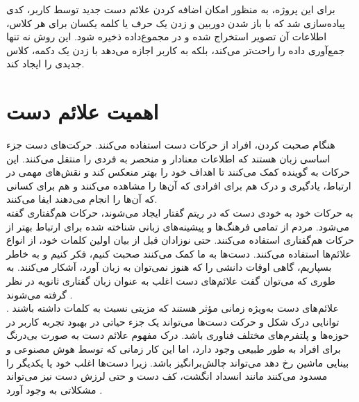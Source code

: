 برای این پروژه، به منظور امکان اضافه کردن علائم دست جدید توسط کاربر، کدی پیاده‌سازی شد که با باز شدن دوربین و زدن یک حرف 
یا کلمه یکسان برای هر کلاس، اطلاعات آن تصویر استخراج شده و در مجموع‌داده ذخیره شود. این روش نه تنها جمع‌آوری داده را راحت‌تر می‌کند، بلکه به کاربر اجازه می‌دهد با زدن یک دکمه، کلاس جدیدی را ایجاد کند.


\section{اهمیت علائم دست}
هنگام صحبت کردن، افراد از حرکات دست استفاده می‌کنند. حرکت‌های دست جزء اساسی زبان هستند که اطلاعات معنادار و منحصر به فردی را منتقل می‌کنند. این حرکات به گوینده کمک می‌کنند تا اهداف خود
 را بهتر منعکس کند و نقش‌های مهمی در ارتباط، یادگیری و درک هم برای افرادی که آن‌ها را مشاهده می‌کنند و هم برای کسانی که آن‌ها را انجام می‌دهند ایفا می‌کنند.
\\
به حرکات خود به خودی دست که در ریتم گفتار ایجاد می‌شوند، حرکات هم‌گفتاری  گفته می‌شود. مردم از تمامی فرهنگ‌ها و پیشینه‌های زبانی شناخته شده برای ارتباط بهتر از حرکات هم‌گفتاری استفاده می‌کنند. حتی نوزادان قبل از بیان اولین کلمات خود، از انواع علائم‌ها استفاده می‌کنند. دست‌ها به ما کمک می‌کنند صحبت کنیم، فکر کنیم و به خاطر بسپاریم، گاهی اوقات دانشی را که هنوز
 نمی‌توان به زبان آورد، آشکار می‌کنند. به طوری که می‌توان گفت علائم‌های دست اغلب به عنوان زبان گفتاری ثانویه در نظر گرفته می‌شوند \cite{clough2020role}.
\\
علائم‌های دست به‌ویژه زمانی مؤثر هستند که مزیتی نسبت به کلمات داشته باشند \cite{kang2016hands}. توانایی درک شکل و حرکت دست‌ها می‌تواند یک
 جزء حیاتی در بهبود تجربه کاربر  در حوزه‌ها و پلتفرم‌های مختلف فناوری باشد. درک مفهوم علائم دست به صورت بی‌درنگ برای افراد به طور طبیعی وجود دارد، اما این کار زمانی که توسط هوش مصنوعی و بینایی ماشین رخ دهد می‌تواند چالش‌برانگیز باشد. زیرا
دست‌ها اغلب خود یا یکدیگر را مسدود می‌کنند مانند انسداد انگشت، کف دست و حتی لرزش دست نیز می‌تواند مشکلاتی به وجود آورد \cite{zhang2020mediapipe}.


